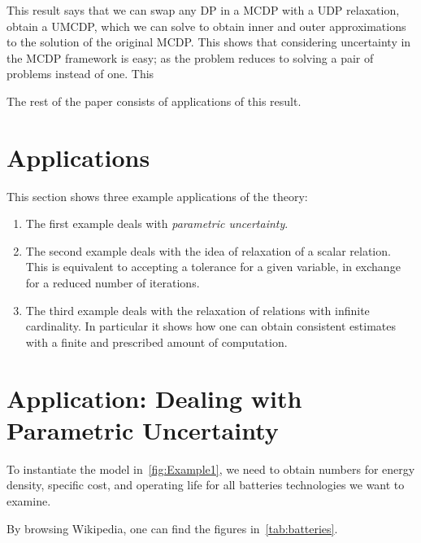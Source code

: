 This result says that we can swap any DP in a MCDP with a UDP relaxation,
obtain a UMCDP, which we can solve to obtain inner and outer approximations
to the solution of the original MCDP. This shows that considering
uncertainty in the MCDP framework is easy; as the problem reduces
to solving a pair of problems instead of one. This

The rest of the paper consists of applications of this result.


\section{Applications\label{sec:Applications}}

This section shows three example applications of the theory:
\begin{enumerate}
    \item The first example deals with \emph{parametric uncertainty}.
    \item The second example deals with the idea of relaxation of a scalar relation.
    This is equivalent to accepting a tolerance for a given variable,
    in exchange for a reduced number of iterations.
    \item The third example deals with the relaxation of relations with infinite
    cardinality. In particular it shows how one can obtain consistent
    estimates with a finite and prescribed amount of computation.
\end{enumerate}


\section{Application: Dealing with Parametric Uncertainty\label{sec:Application-uncertainty}}

To instantiate the model in~\cref{fig:Example1}, we need to
obtain numbers for energy density, specific cost, and operating life
for all batteries technologies we want to examine.

By browsing Wikipedia, one can find the figures in~\cref{tab:batteries}.

